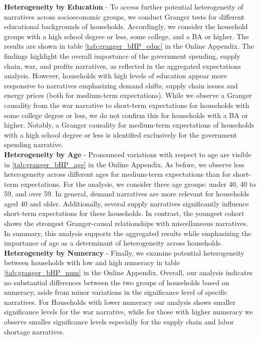 \noindent \textbf{Heterogeneity by Education} - To access further potential heterogeneity of narratives across socioeconomic groups, we conduct Granger tests for different educational backgrounds of households. Accordingly, we consider the household groups with a high school degree or less, some college, and a BA or higher. The results are shown in table \ref{tab:granger_bHP_educ} in the Online Appendix. The findings highlight the overall importance of the government spending, supply chain, war, and profits narratives, as reflected in the aggregated expectations analysis.  However, households with high levels of education appear more responsive to narratives emphasizing demand shifts, supply chain issues and energy prices (both for medium-term expectations). While we observe a Granger causality from the war narrative to short-term expectations for households with some college degree or less, we do not confirm this for households with a BA or higher. Notably, a Granger causality for medium-term expectations of households with a high school degree or less is identified exclusively for the government spending narrative.\\

\noindent \textbf{Heterogeneity by Age} - Pronounced variations with respect to age are visible in \ref{tab:granger_bHP_age} in the Online Appendix. As before, we observe less heterogeneity across different ages for medium-term expectations than for short-term expectations. For the analysis, we consider three age groups: under 40, 40 to 59, and over 59. In general, demand narratives are more relevant for households aged 40 and older. Additionally, several supply narratives significantly influence short-term expectations for these households. In contrast, the youngest cohort shows the strongest Granger-causal relationships with miscellaneous narratives. In summary, this analysis supports the aggregated results while emphasizing the importance of age as a determinant of heterogeneity across households. \\

\noindent\textbf{Heterogeneity by Numeracy} - Finally, we examine potential heterogeneity between households with low and high numeracy in table \ref{tab:granger_bHP_num} in the Online Appendix. Overall, our analysis indicates no substantial differences between the two groups of households based on numeracy, aside from minor variations in the significance level of specific narratives. For Households with lower numeracy our analysis shows smaller significance levels for the war narrative, while for those with higher numeracy we observe smaller significance levels especially for the supply chain and labor shortage narratives.

